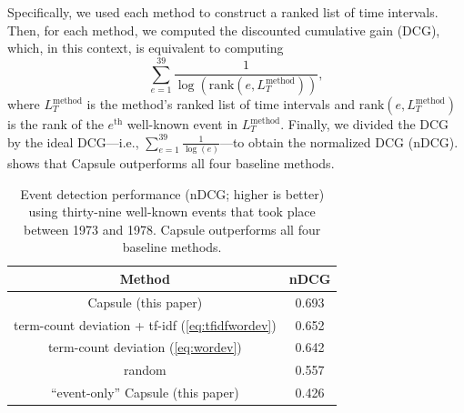 Specifically, we used each method to construct a ranked list of time
intervals. Then, for each method, we computed the discounted
cumulative gain (DCG), which, in this context, is equivalent to
computing
\begin{equation}
  \sum_{e=1}^{39} \frac{1}{\log{\left(\textrm{rank}\left(e, L_T^{\textrm{method}}\right)\right)}},
\end{equation}
where $L_T^{\textrm{method}}$ is the method's ranked list of time
intervals and $\textrm{rank}\left(e, L_T^{\textrm{method}}\right)$ is
the rank of the $e^{\textrm{th}}$ well-known event in
$L_T^{\textrm{method}}$. Finally, we divided the DCG by the ideal
DCG---i.e., $\sum_{e=1}^{39} \frac{1}{\log{\left(e\right)}}$---to
obtain the normalized DCG (nDCG).  shows that
Capsule outperforms all four baseline methods.

\begin{table}[t]
\centering
\small
\begin{tabular}{cc}
\toprule
\textbf{Method} & \textbf{nDCG} \\
\midrule
Capsule (this paper) & 0.693 \\
term-count deviation + tf-idf (\cref{eq:tfidfwordev}) & 0.652 \\
term-count deviation (\cref{eq:wordev}) & 0.642 \\
random & 0.557\\
``event-only'' Capsule (this paper) & 0.426\\
\bottomrule
\end{tabular}
\caption{Event detection performance (nDCG; higher is better) using
  thirty-nine well-known events that took place between 1973 and 1978.
  Capsule outperforms all four baseline methods.}
\label{table:cables:ndcg}
\end{table}


